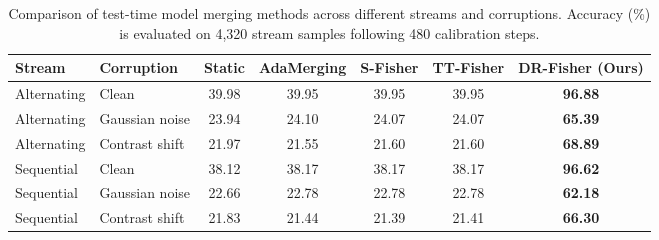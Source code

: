 
\begin{table}[t]
\caption{Comparison of test-time model merging methods across different streams and corruptions. Accuracy (\%) is evaluated on 4,320 stream samples following 480 calibration steps.}
\label{tab:main_results}
\vskip 0.15in
\begin{center}
\begin{small}
\begin{sc}
\begin{tabular}{llccccc}
\toprule
Stream & Corruption & Static & AdaMerging & S-Fisher & TT-Fisher & DR-Fisher (Ours) \\
\midrule
Alternating & Clean & 39.98 & 39.95 & 39.95 & 39.95 & \textbf{96.88} \\
Alternating & Gaussian noise & 23.94 & 24.10 & 24.07 & 24.07 & \textbf{65.39} \\
Alternating & Contrast shift & 21.97 & 21.55 & 21.60 & 21.60 & \textbf{68.89} \\
Sequential & Clean & 38.12 & 38.17 & 38.17 & 38.17 & \textbf{96.62} \\
Sequential & Gaussian noise & 22.66 & 22.78 & 22.78 & 22.78 & \textbf{62.18} \\
Sequential & Contrast shift & 21.83 & 21.44 & 21.39 & 21.41 & \textbf{66.30} \\
\bottomrule
\end{tabular}
\end{sc}
\end{small}
\end{center}
\vskip -0.1in
\end{table}

